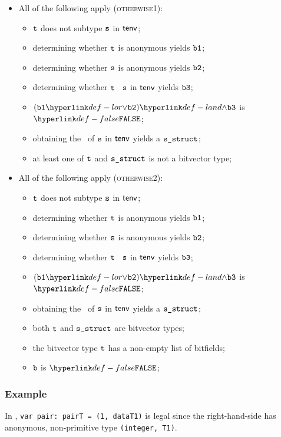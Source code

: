 \begin{itemize}
  \item All of the following apply (\textsc{otherwise1}):
  \begin{itemize}
    \item $\texttt{t}$ does not subtype $\texttt{s}$ in $\textsf{tenv}$;
    \item determining whether $\texttt{t}$ is anonymous yields $\texttt{b1}$;
    \item determining whether $\texttt{s}$ is anonymous yields $\texttt{b2}$;
    \item determining whether $\texttt{t}$ \subtypesatisfies\ $\texttt{s}$ in $\textsf{tenv}$ yields $\texttt{b3}$;
    \item $(\vbone \lor \vbtwo) \land \vbthree$ is $\False$;
    \item obtaining the \structure\ of $\texttt{s}$ in $\textsf{tenv}$ yields a $\texttt{s\_struct}$\ProseOrTypeError;
    \item at least one of $\texttt{t}$ and $\texttt{s\_struct}$ is not a bitvector type;
  \end{itemize}

  \item All of the following apply (\textsc{otherwise2}):
  \begin{itemize}
    \item $\texttt{t}$ does not subtype $\texttt{s}$ in $\textsf{tenv}$;
    \item determining whether $\texttt{t}$ is anonymous yields $\texttt{b1}$;
    \item determining whether $\texttt{s}$ is anonymous yields $\texttt{b2}$;
    \item determining whether $\texttt{t}$ \subtypesatisfies\ $\texttt{s}$ in $\textsf{tenv}$ yields $\texttt{b3}$;
    \item $(\vbone \lor \vbtwo) \land \vbthree$ is $\False$;
    \item obtaining the \structure\ of $\texttt{s}$ in $\textsf{tenv}$ yields a $\texttt{s\_struct}$\ProseOrTypeError;
    \item both $\texttt{t}$ and $\texttt{s\_struct}$ are bitvector types;
    \item the bitvector type $\texttt{t}$ has a non-empty list of bitfields;
    \item $\texttt{b}$ is $\False$;
  \end{itemize}
\end{itemize}

\subsubsection{Example}
In ,
\texttt{var pair: pairT = (1, dataT1)} is legal since the right-hand-side has
anonymous, non-primitive type \texttt{(integer, T1)}.

